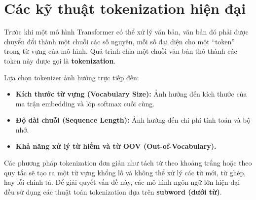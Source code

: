 
\section{Các kỹ thuật tokenization hiện đại}
\label{sec:modern_tokenization}

Trước khi một mô hình Transformer có thể xử lý văn bản, văn bản đó phải được chuyển đổi thành một chuỗi các số nguyên, mỗi số đại diện cho một “token” trong từ vựng của mô hình. Quá trình chia một chuỗi văn bản thô thành các token này được gọi là \textbf{tokenization}.

Lựa chọn tokenizer ảnh hưởng trực tiếp đến:
\begin{itemize}
    \item \textbf{Kích thước từ vựng (Vocabulary Size):} Ảnh hưởng đến kích thước của ma trận embedding và lớp softmax cuối cùng.
    \item \textbf{Độ dài chuỗi (Sequence Length):} Ảnh hưởng đến chi phí tính toán và bộ nhớ.
    \item \textbf{Khả năng xử lý từ hiếm và từ OOV (Out-of-Vocabulary).}
\end{itemize}

Các phương pháp tokenization đơn giản như tách từ theo khoảng trắng hoặc theo quy tắc sẽ tạo ra một từ vựng khổng lồ và không thể xử lý các từ mới, từ ghép, hay lỗi chính tả. Để giải quyết vấn đề này, các mô hình ngôn ngữ lớn hiện đại đều sử dụng các thuật toán tokenization dựa trên \textbf{subword (dưới từ)}.

